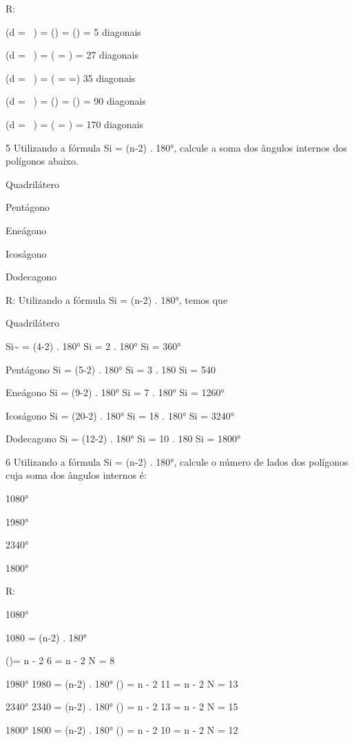 {R:
\item (d = \ ) = () =
() = 5 diagonais
\item (d = \ ) = ( = ) =
27 diagonais
\item (d = \ ) =
( =  =) 35 diagonais
\item (d = \ ) = () =
() = 90 diagonais
\item (d = \ ) =
( = ) = 170 diagonais

\num{5} Utilizando a fórmula Si = (n-2) . 180°, calcule a soma dos ângulos
internos dos polígonos abaixo.
\item Quadrilátero
\item Pentágono
\item Eneágono
\item Icoságono
\item Dodecagono

R: Utilizando a fórmula Si = (n-2) . 180°, temos que
\item Quadrilátero

Si\textasciitilde{} = (4-2) . 180°
Si = 2 . 180°
Si = 360°
\item Pentágono
Si = (5-2) . 180°
Si = 3 . 180
Si = 540
\item Eneágono
Si = (9-2) . 180°
Si = 7 . 180°
Si = 1260°
\item Icoságono
Si = (20-2) . 180°
Si = 18 . 180°
Si = 3240°
\item Dodecagono
Si = (12-2) . 180°
Si = 10 . 180
Si = 1800°

\num{6} Utilizando a fórmula Si = (n-2) . 180°, calcule o número de lados dos
polígonos cuja soma dos ângulos internos é:
\item 1080°
\item 1980°
\item 2340°
\item 1800°

R:
\item 1080°

1080 = (n-2) . 180°

()= n - 2
6 = n - 2
N = 8
\item 1980°
1980 = (n-2) . 180°
() = n - 2
11 = n - 2
N = 13
\item 2340°
2340 = (n-2) . 180°
() = n - 2
13 = n - 2
N = 15
\item 1800°
1800 = (n-2) . 180°
() = n - 2
10 = n - 2
N = 12

}
